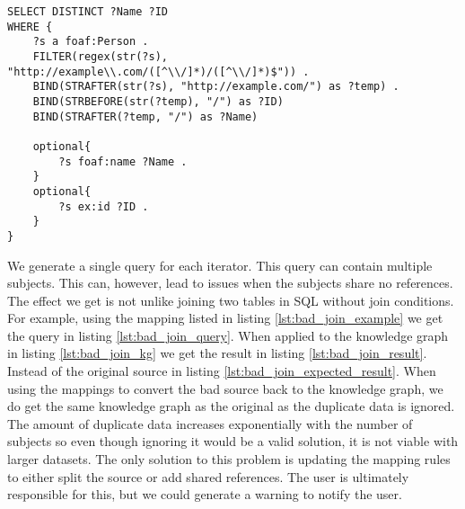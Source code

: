 \begin{lstlisting}[caption={Template query example}, label={lst:template_query_example}, captionpos=b]
SELECT DISTINCT ?Name ?ID
WHERE {
    ?s a foaf:Person .
    FILTER(regex(str(?s), "http://example\\.com/([^\\/]*)/([^\\/]*)$")) .
    BIND(STRAFTER(str(?s), "http://example.com/") as ?temp) .
    BIND(STRBEFORE(str(?temp), "/") as ?ID)
    BIND(STRAFTER(?temp, "/") as ?Name)

    optional{
        ?s foaf:name ?Name .
    }
    optional{
        ?s ex:id ?ID .
    }
}
\end{lstlisting}

We generate a single query for each iterator. This query can contain multiple subjects. This can, however, lead to issues when the subjects share no references. The effect we get is not unlike joining two tables in SQL without join conditions. For example, using the mapping listed in listing \ref{lst:bad_join_example} we get the query in listing \ref{lst:bad_join_query}. When applied to the knowledge graph in listing \ref{lst:bad_join_kg} we get the result in listing \ref{lst:bad_join_result}. Instead of the original source in listing \ref{lst:bad_join_expected_result}. When using the mappings to convert the bad source back to the knowledge graph, we do get the same knowledge graph as the original as the duplicate data is ignored. The amount of duplicate data increases exponentially with the number of subjects so even though ignoring it would be a valid solution, it is not viable with larger datasets. The only solution to this problem is updating the mapping rules to either split the source or add shared references. The user is ultimately responsible for this, but we could generate a warning to notify the user. 


